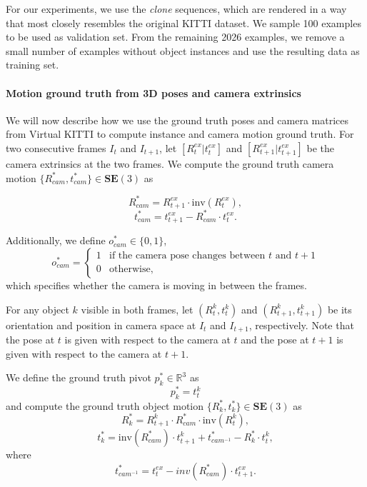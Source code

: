 For our experiments, we use the \emph{clone} sequences, which are rendered in a
way that most closely resembles the original KITTI dataset. We sample 100 examples
to be used as validation set. From the remaining 2026 examples,
we remove a small number of examples without object instances and use the resulting
data as training set.

\paragraph{Motion ground truth from 3D poses and camera extrinsics}
We will now describe how we use the ground truth poses and camera matrices from Virtual KITTI to
compute instance and camera motion ground truth.
For two consecutive frames $I_t$ and $I_{t+1}$,
let $[R_t^{ex}|t_t^{ex}]$
and $[R_{t+1}^{ex}|t_{t+1}^{ex}]$
be the camera extrinsics at the two frames.
We compute the ground truth camera motion
$\{R_{cam}^*, t_{cam}^*\} \in \mathbf{SE}(3)$ as

\begin{equation}
R_{cam}^* = R_{t+1}^{ex}  \cdot \mathrm{inv}(R_t^{ex}),
\end{equation}
\begin{equation}
t_{cam}^* = t_{t+1}^{ex}  - R_{cam}^* \cdot t_t^{ex}.
\end{equation}

Additionally, we define $o_{cam}^* \in \{ 0, 1 \}$,
\begin{equation}
o_{cam}^* =
\begin{cases}
1 &\text{if the camera pose changes between $t$ and $t+1$} \\
0 &\text{otherwise,}
\end{cases}
\end{equation}
which specifies whether the camera is moving in between the frames.

For any object $k$ visible in both frames, let
$(R_t^k, t_t^k)$ and $(R_{t+1}^k, t_{t+1}^k)$
be its orientation and position in camera space
at $I_t$ and $I_{t+1}$, respectively.
Note that the pose at $t$ is given with respect to the camera at $t$ and
the pose at $t+1$ is given with respect to the camera at $t+1$.

We define the ground truth pivot $p_k^* \in \mathbb{R}^3$ as
\begin{equation}
p_k^* = t_t^k
\end{equation}
and compute the ground truth object motion
$\{R_k^*, t_k^*\} \in \mathbf{SE}(3)$ as
\begin{equation}
R_k^* = R_{t+1}^k \cdot R_{cam}^* \cdot \mathrm{inv}(R_t^k),
\end{equation}
\begin{equation}
t_k^* = \mathrm{inv}(R_{cam}^*) \cdot t_{t+1}^{k} + t_{cam^{-1}}^* - R_k^* \cdot t_t^k,
\end{equation}
where
\begin{equation}
t_{cam^{-1}}^* = t_{t}^{ex}  - inv(R_{cam}^*) \cdot t_{t+1}^{ex}.
\end{equation}


